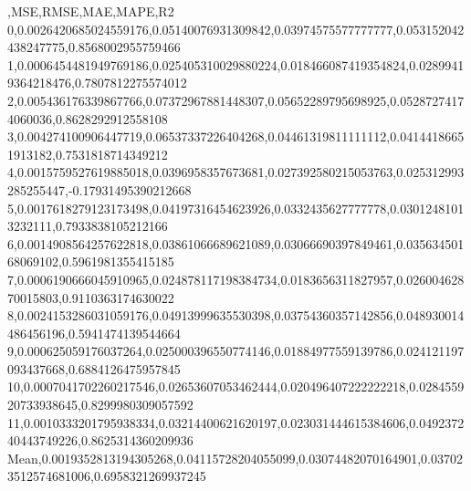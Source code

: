 ,MSE,RMSE,MAE,MAPE,R2
0,0.0026420685024559176,0.05140076931309842,0.03974575577777777,0.053152042438247775,0.8568002955759466
1,0.0006454481949769186,0.025405310029880224,0.018466087419354824,0.02899419364218476,0.7807812275574012
2,0.005436176339867766,0.07372967881448307,0.05652289795698925,0.05287274174060036,0.8628292912558108
3,0.004274100906447719,0.06537337226404268,0.04461319811111112,0.04144186651913182,0.7531818714349212
4,0.0015759527619885018,0.0396958357673681,0.027392580215053763,0.025312993285255447,-0.17931495390212668
5,0.0017618279123173498,0.04197316454623926,0.0332435627777778,0.03012481013232111,0.7933838105212166
6,0.0014908564257622818,0.03861066689621089,0.03066690397849461,0.03563450168069102,0.5961981355415185
7,0.0006190666045910965,0.024878117198384734,0.0183656311827957,0.02600462870015803,0.9110363174630022
8,0.0024153286031059176,0.04913999635530398,0.03754360357142856,0.048930014486456196,0.5941474139544664
9,0.000625059176037264,0.025000396550774146,0.01884977559139786,0.024121197093437668,0.6884126475957845
10,0.0007041702260217546,0.02653607053462444,0.020496407222222218,0.028455920733938645,0.8299980309057592
11,0.0010333201795938334,0.03214400621620197,0.023031444615384606,0.049237240443749226,0.8625314360209936
Mean,0.0019352813194305268,0.04115728204055099,0.03074482070164901,0.037023512574681006,0.6958321269937245
